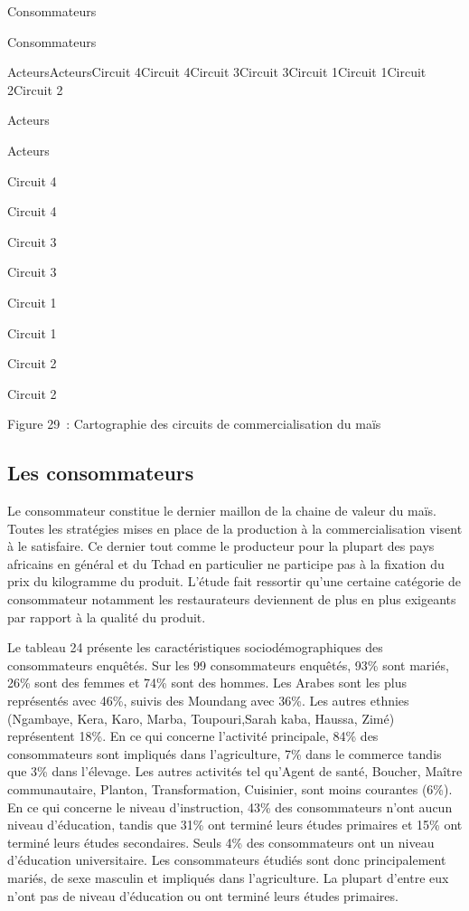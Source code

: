 \documentclass[12pt,oneside]{report}
\begin{document}
Consommateurs

Consommateurs

ActeursActeursCircuit 4Circuit 4Circuit 3Circuit 3Circuit 1Circuit 1Circuit 2Circuit 2

Acteurs

Acteurs

Circuit 4

Circuit 4

Circuit 3

Circuit 3

Circuit 1

Circuit 1

Circuit 2

Circuit 2

Figure 29 : Cartographie des circuits de commercialisation du maïs

\subsection{Les consommateurs}
Le consommateur constitue le dernier maillon de la chaine de valeur du maïs. Toutes les stratégies mises en place de la production à la commercialisation visent à le satisfaire. Ce dernier tout comme le producteur pour la plupart des pays africains en général et du Tchad en particulier ne participe pas à la fixation du prix du kilogramme du produit. L’étude fait ressortir qu’une certaine catégorie de consommateur notamment les restaurateurs deviennent de plus en plus exigeants par rapport à la qualité du produit.

Le tableau 24 présente les caractéristiques sociodémographiques des consommateurs enquêtés. Sur les 99 consommateurs enquêtés, 93\% sont mariés, 26\% sont des femmes et 74\% sont des hommes. Les Arabes sont les plus représentés avec 46\%, suivis des Moundang avec 36\%. Les autres ethnies (Ngambaye, Kera, Karo, Marba, Toupouri,Sarah kaba, Haussa, Zimé) représentent 18\%. En ce qui concerne l'activité principale, 84\% des consommateurs sont impliqués dans l'agriculture, 7\% dans le commerce tandis que 3\% dans l’élevage. Les autres activités tel qu’Agent de santé, Boucher, Maître communautaire, Planton, Transformation, Cuisinier, sont moins courantes (6\%). En ce qui concerne le niveau d'instruction, 43\% des consommateurs n'ont aucun niveau d'éducation, tandis que 31\% ont terminé leurs études primaires et 15\% ont terminé leurs études secondaires. Seuls 4\% des consommateurs ont un niveau d'éducation universitaire. Les consommateurs étudiés sont donc principalement mariés, de sexe masculin et impliqués dans l'agriculture. La plupart d'entre eux n'ont pas de niveau d'éducation ou ont terminé leurs études primaires.
\end{document}
